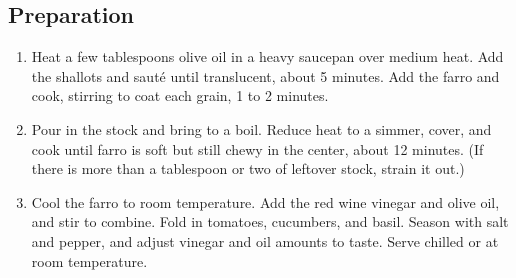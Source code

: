 \subsection{Preparation}
\begin{enumerate}
    \item Heat a few tablespoons olive oil in a heavy saucepan over medium heat. Add the shallots and saut\'{e} until translucent, about 5 minutes. Add the farro and cook, stirring to coat each grain, 1 to 2 minutes. 
    \item Pour in the stock and bring to a boil. Reduce heat to a simmer, cover, and cook until farro is soft but still chewy in the center, about 12 minutes. (If there is more than a tablespoon or two of leftover stock, strain it out.)
    \item Cool the farro to room temperature. Add the red wine vinegar and olive oil, and stir to combine. Fold in tomatoes, cucumbers, and basil. Season with salt and pepper, and adjust vinegar and oil amounts to taste. Serve chilled or at room temperature.
\end{enumerate}

